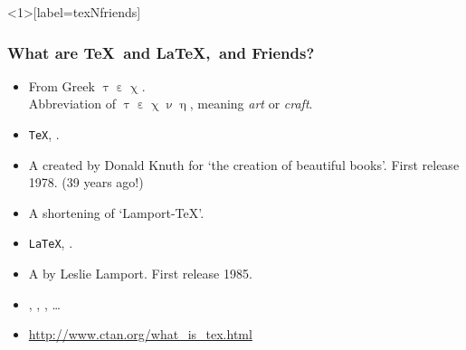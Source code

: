 \begin{frame}<1>[label=texNfriends]
\frametitle{What are \TeX\ and \LaTeX,\ and Friends?}

\begin{description}
\item<1>[\TeX] 
\begin{itemize}
\item From Greek $\uptau\upepsilon\upchi$. \\
Abbreviation of $\uptau\upepsilon\upchi\upnu\upeta$, meaning \emph{art} or \emph{craft}.
\item {} \texttt{TeX}, .
\item A  created by Donald Knuth
for `the creation of beautiful books'. First release 1978. (39 years ago!)
\end{itemize}


\item<2>[\LaTeX]
\begin{itemize}
\item A shortening of `Lamport-\TeX'.
\item {} \texttt{LaTeX}, .
\item A  by Leslie Lamport. First release 1985.
	\end{itemize}

\item <3>[Friends]
\begin{itemize}
\item {}, , , \ldots
\item \url{http://www.ctan.org/what_is_tex.html}
\end{itemize}
\end{description}
\end{frame}


